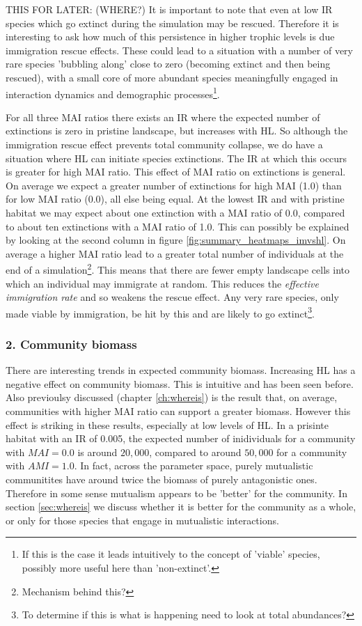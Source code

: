\begin{itemize}
THIS FOR LATER: (WHERE?) It is important to note that even at low IR species which go extinct during the simulation may be rescued. Therefore it is interesting to ask how much of this persistence in higher trophic levels is due immigration rescue effects. These could lead to a situation with a number of very rare species 'bubbling along' close to zero (becoming extinct and then being rescued), with a small core of more abundant species meaningfully engaged in interaction dynamics and demographic processes\footnote{If this is the case it leads intuitively to the concept of 'viable' species, possibly more useful here than 'non-extinct'.}.

For all three MAI ratios there exists an IR where the expected number of extinctions is zero in pristine landscape, but increases with HL. So although the immigration rescue effect prevents total community collapse, we do have a situation where HL can initiate species extinctions. The IR at which this occurs is greater for high MAI ratio. This effect of MAI ratio on extinctions is general. On average we expect a greater number of extinctions for high MAI (1.0) than for low MAI ratio (0.0), all else being equal. At the lowest IR and with pristine habitat we may expect about one extinction with a MAI ratio of 0.0, compared to about ten extinctions with a MAI ratio of 1.0. This can possibly be explained by looking at the second column in figure \ref{fig:summary_heatmaps_imvshl}. On average a higher MAI ratio lead to a greater total number of individuals at the end of a simulation\footnote{Mechanism behind this?}. This means that there are fewer empty landscape cells into which an individual may immigrate at random. This reduces the \emph{effective immigration rate} and so weakens the rescue effect. Any very rare species, only made viable by immigration, be hit by this and are likely to go extinct\footnote{To determine if this is what is happening need to look at total abundances?}. 

\subsubsection*{2. Community biomass}
\label{sec:com_bio}
There are interesting trends in expected community biomass. Increasing HL has a negative effect on community biomass. This is intuitive and has been seen before. Also previoulsy discussed (chapter \ref{ch:whereis}) is the result that, on average, communities with higher MAI ratio can support a greater biomass. However this effect is striking in these results, especially at low levels of HL. In a prisinte habitat with an IR of 0.005, the expected number of inidividuals for a community with $MAI=0.0$ is around $20,000$, compared to around $50,000$ for a community with $AMI=1.0$. In fact, across the parameter space, purely mutualistic communitites have around twice the biomass of purely antagonistic ones. Therefore in some sense mutualism appears to be 'better' for the community. In section \ref{sec:whereis} we discuss whether it is better for the community as a whole, or only for those species that engage in mutualistic interactions.


\end{itemize}

